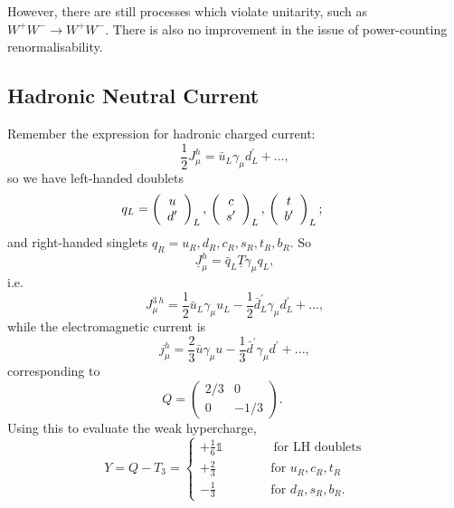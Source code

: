 However, there are still processes which violate unitarity, such as $W^+W^- \to W^+W^-$. There is also no improvement in the issue of power-counting renormalisability. 
%
\subsection{Hadronic Neutral Current}
%
Remember the expression for hadronic charged current:
\begin{equation}
\frac{1}{2}J_\mu^h = \bar{u}_L \gamma_\mu d^\prime_L + ...,
\end{equation}
so we have left-handed doublets
\[ q_L = \left( \begin{array}{cc}
u   \\
d^\prime   \end{array} \right)_L, \qquad
  \\ \left( \begin{array}{cc}
 c \\
s^\prime   \end{array} \right)_L, \qquad  \\ 
\left( \begin{array}{cc}
 t \\
b^\prime   \end{array} \right)_L; \qquad\] 
and right-handed singlets $q_R = u_R, d_R, c_R, s_R, t_R, b_R$.  So
\begin{equation}
\underline{J}^h_\mu = \bar{q}_L \underline{T} \gamma_\mu q_L,
\end{equation}
i.e.
\begin{equation}
J_\mu^{3\ h} = \frac{1}{2}\bar{u}_L \gamma_\mu u_L - \frac{1}{2} \bar{d}_L^\prime \gamma_\mu d_L^\prime + ...,
\end{equation}
while the electromagnetic current is
\begin{equation}
j_\mu^h = \frac{2}{3} \bar{u} \gamma_\mu u - \frac{1}{3} \bar{d}^\prime \gamma_\mu d^\prime + ...,
\end{equation}
corresponding to 
\[ Q = \left( \begin{array}{cc}
2/3 & 0   \\
0 & -1/3   \end{array} \right). \qquad \]
Using this to evaluate the weak hypercharge,
\begin{equation}
Y = Q - T_3 =
\begin{cases}
+\frac{1}{6}\mathds{1} \qquad \qquad \text{for LH doublets} \\
+\frac{2}{3} \qquad \qquad \text{  for } u_R, c_R, t_R \\
-\frac{1}{3} \qquad \qquad \text{  for } d_R, s_R, b_R. 
\end{cases}
\end{equation}

